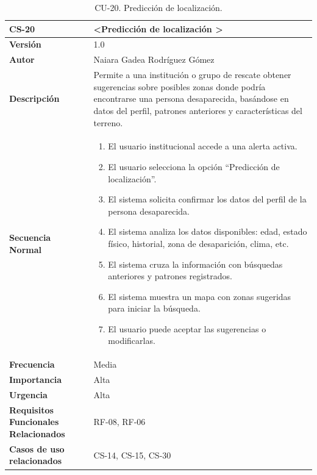 \begin{table}[htbp] %
\centering
\begin{tabular}{ |m{3cm}|m{11cm}|  } 
\hline
\cellcolor[HTML]{B9E3F0}\centering\textbf{CS-20} & \cellcolor[HTML]{B9E3F0}\textbf{\textless Predicción de localización \textgreater}\\

\hline
\cellcolor[HTML]{EFEFEF}\textbf{Versión}             & 1.0  \\
\hline
\cellcolor[HTML]{EFEFEF}\textbf{Autor}                & Naiara Gadea Rodríguez Gómez\\
\hline
\cellcolor[HTML]{EFEFEF}\textbf{Descripción}                & {Permite a una institución o grupo de rescate obtener sugerencias sobre posibles zonas donde podría encontrarse una persona desaparecida, basándose en datos del perfil, patrones anteriores y características del terreno.}\\
\hline
\cellcolor[HTML]{EFEFEF}\textbf{Secuencia \newline Normal}                &                 
        \begin{enumerate}
			\item El usuario institucional accede a una alerta activa.
			\item El usuario selecciona la opción “Predicción de localización”.
			\item El sistema solicita confirmar los datos del perfil de la persona desaparecida.
			\item El sistema analiza los datos disponibles: edad, estado físico, historial, zona de desaparición, clima, etc.
			\item El sistema cruza la información con búsquedas anteriores y patrones registrados.
			\item El sistema muestra un mapa con zonas sugeridas para iniciar la búsqueda.
			\item El usuario puede aceptar las sugerencias o modificarlas.
		\end{enumerate}\\
\hline
\cellcolor[HTML]{EFEFEF}\textbf{Frecuencia}                & Media\\
\hline
\cellcolor[HTML]{EFEFEF}\textbf{Importancia}                & Alta\\
\hline
\cellcolor[HTML]{EFEFEF}\textbf{Urgencia}                & Alta\\
\hline
\cellcolor[HTML]{EFEFEF}\textbf{Requisitos Funcionales Relacionados}                & {RF-08, RF-06}\\
\hline
\cellcolor[HTML]{EFEFEF}\textbf{Casos de uso relacionados}                & {CS-14, CS-15, CS-30}\\
\hline
\end{tabular}
\caption{CU-20. Predicción de localización.}
\end{table}

